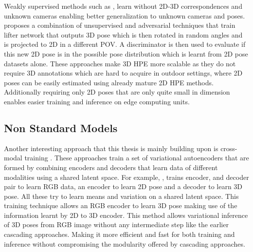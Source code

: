 Weakly supervised methods such as \cite{repnet}, learn without 2D-3D correspondences and unknown cameras enabling better generalization to unknown cameras and poses. \cite{amazon1} proposes a combination of unsupervised and adversarial techniques that train lifter network that outputs 3D pose which is then rotated in random angles and is projected to 2D in a different \ac{POV}. A discriminator is then used to evaluate if this new 2D pose is in the possible pose distribution which is learnt from 2D pose datasets alone. These approaches make 3D \ac{HPE} more scalable as they do not require 3D annotations which are hard to acquire in outdoor settings, where 2D poses can be easily estimated using already mature 2D \ac{HPE} methods. Additionally requiring only 2D poses that are only quite small in dimension enables easier training and inference on edge computing units. 

\subsection{Non Standard Models}
Another interesting approach that this thesis is mainly building upon is cross-modal training \cite{CrossingNets, crossmodal}. These approaches train a set of variational autoencoders that are formed by combining encoders and decoders that learn data of different modalities using a shared latent space. For example, \cite{crossmodal}, trains encoder, and decoder pair to learn \ac{RGB} data, an encoder to learn 2D pose and a decoder to learn 3D pose. All these try to learn means and variation on a shared latent space. This training technique allows an \ac{RGB} encoder to learn 3D pose making use of the information learnt by 2D to 3D encoder. This method allows variational inference of 3D poses from \ac{RGB} image without any intermediate step like the earlier cascading approaches. Making it more efficient and fast for both training and inference without compromising the modularity offered by cascading approaches. 






